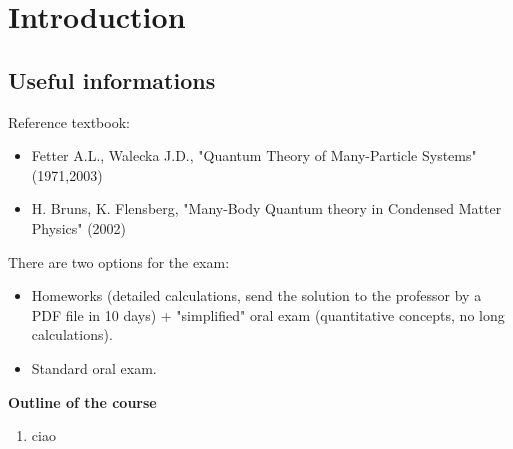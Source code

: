 \documentclass[11pt, a4paper, twoside, openright]{book}
\begin{document}
\chapter*{Introduction}

\section*{Useful informations}

Reference textbook:
\begin{itemize}
\item Fetter A.L., Walecka J.D., "Quantum Theory of Many-Particle Systems" (1971,2003)
\item  H. Bruns, K. Flensberg, "Many-Body Quantum theory in Condensed Matter Physics" (2002)
\end{itemize}

There are two options for the exam:
\begin{itemize}
\item Homeworks (detailed calculations, send the solution to the professor by a PDF file in 10 days) + "simplified" oral exam (quantitative concepts, no long calculations).
\item Standard oral exam.
\end{itemize}

\clearpage
\LARGE{ \textbf{Outline of the course} }

\normalsize
\begin{enumerate}
\item ciao
\end{enumerate}






\mainmatter
\pagestyle{fancy}













\backmatter
\pagestyle{plain}



\end{document}
